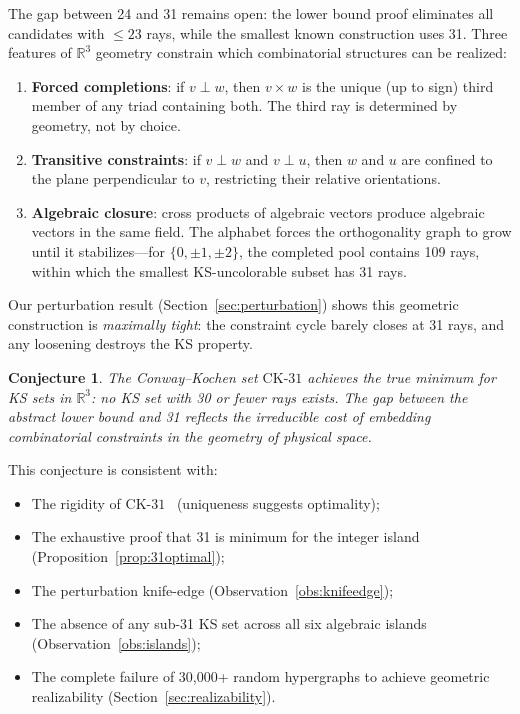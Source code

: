 \documentclass[12pt,a4paper]{article}
\newtheorem{conjecture}[theorem]{Conjecture}
\newcommand{\R}{\mathbb{R}}
\newcommand{\CK}{\mathrm{CK}\text{-}31}
\begin{document}
The gap between 24 and 31 remains open: the lower bound proof eliminates all candidates with $\leq 23$ rays, while the smallest known construction uses 31. Three features of $\R^3$ geometry constrain which combinatorial structures can be realized:

\begin{enumerate}
    \item \textbf{Forced completions}: if $v \perp w$, then $v \times w$ is the unique (up to sign) third member of any triad containing both. The third ray is determined by geometry, not by choice.
    \item \textbf{Transitive constraints}: if $v \perp w$ and $v \perp u$, then $w$ and $u$ are confined to the plane perpendicular to $v$, restricting their relative orientations.
    \item \textbf{Algebraic closure}: cross products of algebraic vectors produce algebraic vectors in the same field. The alphabet forces the orthogonality graph to grow until it stabilizes---for $\{0, \pm 1, \pm 2\}$, the completed pool contains 109 rays, within which the smallest KS-uncolorable subset has 31 rays.
\end{enumerate}

Our perturbation result (Section~\ref{sec:perturbation}) shows this geometric construction is \emph{maximally tight}: the constraint cycle barely closes at 31 rays, and any loosening destroys the KS property.

\begin{conjecture}\label{conj:optimal}
The Conway--Kochen set $\CK$ achieves the true minimum for KS sets in $\R^3$: no KS set with 30 or fewer rays exists. The gap between the abstract lower bound and 31 reflects the irreducible cost of embedding combinatorial constraints in the geometry of physical space.
\end{conjecture}

This conjecture is consistent with:
\begin{itemize}
    \item The rigidity of $\CK$~\cite{TrandafirCabello2025} (uniqueness suggests optimality);
    \item The exhaustive proof that 31 is minimum for the integer island (Proposition~\ref{prop:31optimal});
    \item The perturbation knife-edge (Observation~\ref{obs:knifeedge});
    \item The absence of any sub-31 KS set across all six algebraic islands (Observation~\ref{obs:islands});
    \item The complete failure of 30{,}000+ random hypergraphs to achieve geometric realizability (Section~\ref{sec:realizability}).
\end{itemize}
\end{document}
